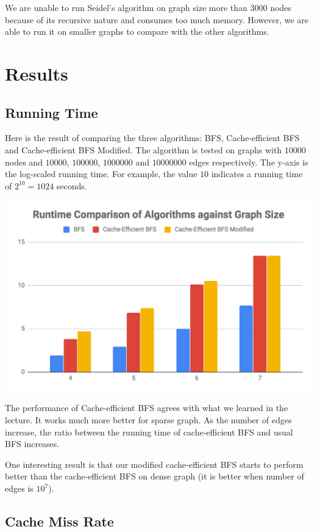 \documentclass[12pt]{article}
\begin{document}
We are unable to run Seidel's algorithm on graph size more than $3000$ nodes because of its recursive nature and consumes too much memory. However, we are able to run it on smaller graphs to compare with the other algorithms.

\pagebreak

\section{Results}

\subsection{Running Time}

Here is the result of comparing the three algorithms: BFS, Cache-efficient BFS and Cache-efficient BFS Modified. The algorithm is tested on graphs with $10000$ nodes and $10000$, $100000$, $1000000$ and $10000000$ edges respectively. The y-axis is the log-scaled running time. For example, the value $10$ indicates a running time of $2^{10} = 1024$ seconds.

\includegraphics[scale=0.4]{graph-1}

The performance of Cache-efficient BFS agrees with what we learned in the lecture. It works much more better for sparse graph. As the number of edges increase, the ratio between the running time of cache-efficient BFS and usual BFS increases.

One interesting result is that our modified cache-efficient BFS starts to perform better than the cache-efficient BFS on dense graph (it is better when number of edges is $10^7$).

\pagebreak

\subsection{Cache Miss Rate}
\end{document}
